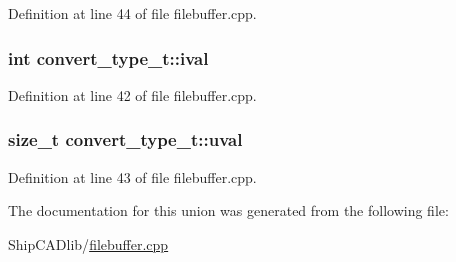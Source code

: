 Definition at line 44 of file filebuffer.\-cpp.

\hypertarget{unionconvert__type__t_a9eef931dacbc2c9fe0b67edc5e053624}{
\subsubsection[{ival}]{\setlength{\rightskip}{0pt plus 5cm}int convert\-\_\-type\-\_\-t\-::ival}}\label{unionconvert__type__t_a9eef931dacbc2c9fe0b67edc5e053624}


Definition at line 42 of file filebuffer.\-cpp.

\hypertarget{unionconvert__type__t_ab2a3ae21cfb1610cc473234ce3e7661e}{
\subsubsection[{uval}]{\setlength{\rightskip}{0pt plus 5cm}size\-\_\-t convert\-\_\-type\-\_\-t\-::uval}}\label{unionconvert__type__t_ab2a3ae21cfb1610cc473234ce3e7661e}


Definition at line 43 of file filebuffer.\-cpp.



The documentation for this union was generated from the following file\-:\begin{DoxyCompactItemize}
\item 
Ship\-C\-A\-Dlib/\hyperlink{filebuffer_8cpp}{filebuffer.\-cpp}\end{DoxyCompactItemize}
